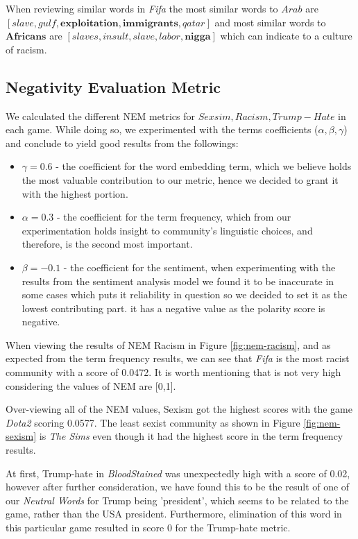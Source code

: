 When reviewing similar words in \emph{Fifa} the most similar words to $Arab$ are $[slave, gulf, \textbf{exploitation}, \textbf{immigrants}, qatar]$ and most similar words to $\textbf{Africans}$ are $[slaves, insult, slave, labor, \textbf{nigga}]$ which can indicate to a culture of racism.



\subsection{Negativity Evaluation Metric}
We calculated the different NEM metrics for $Sexsim, Racism, Trump-Hate$ in each game. While doing so, we experimented with the terms coefficients ($\alpha, \beta, \gamma$) and conclude to yield good results from the followings:

\begin{itemize}
\itemsep0em 
    \item $\gamma=0.6$ - the coefficient for the word embedding term, which we believe holds the most valuable contribution to our metric, hence we decided to grant it with the highest portion.
    \item $\alpha=0.3$ - the coefficient for the term frequency, which from our experimentation holds insight to community's linguistic choices, and therefore, is the second most important. 
    \item $\beta=-0.1$ - the coefficient for the sentiment, when experimenting with the results from the sentiment analysis model we found it to be inaccurate in some cases which puts it reliability in question so we decided to set it as the lowest contributing part. it has a negative value as the polarity score is negative.
\end{itemize}

When viewing the results of NEM Racism in Figure \ref{fig:nem-racism}, and as expected from the term frequency results, we can see that \emph{Fifa} is the most racist community with a score of 0.0472. It is worth mentioning that is not very high considering the values of NEM are [0,1].


Over-viewing all of the NEM values, Sexism got the highest scores with the game \emph{Dota2} scoring 0.0577.
The least sexist community as shown in Figure \ref{fig:nem-sexism} is \emph{The Sims} even though it had the highest score in the term frequency results. 

At first, Trump-hate in \emph{BloodStained} was unexpectedly high with a score of 0.02, however after further consideration, we have found this to be the result of one of our \emph{Neutral Words} for Trump being 'president', which seems to be related to the game, rather than the USA president. Furthermore, elimination of this word in this particular game resulted in score 0 for the Trump-hate metric.

